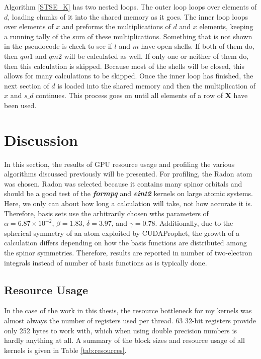 \documentclass[12pt]{report}
\newcommand{\kernel}[1]{\textit{\textbf{#1}}}
\begin{document}
Algorithm \ref{STSE_K} has two nested loops. The outer loop loops over elements of $d$, loading chunks of it into the shared memory as it goes. The inner loop loops over elements of $x$ and preforms the multiplications of $d$ and $x$ elements, keeping a running tally of the sum of these multiplications. Something that is not shown in the pseudocode is check to see if $l$ and $m$ have open shells. If both of them do, then $qm1$ and $qm2$ will be calculated as well. If only one or neither of them do, then this calculation is skipped. Because most of the shells will be closed, this allows for many calculations to be skipped. Once the inner loop has finished, the next section of $d$ is loaded into the shared memory and then the multiplication of $x$ and $s\_d$ continues. This process goes on until all elements of a row of \textbf{X} have been used.

\section{Discussion}
In this section, the results of GPU resource usage and profiling the various algorithms discussed previously will be presented. For profiling, the Radon atom was chosen. Radon was selected because it contains many spinor orbitals and should be a good test of the \kernel{formpq} and \kernel{eint2} kernels on large atomic systems. Here, we only can about how long a calculation will take, not how accurate it is. Therefore, basis sets use the arbitrarily chosen wtbs parameters of $\alpha = 6.87\times10^{-2}$, $\beta = 1.83$,  $\delta = 3.97$, and $\gamma = 0.78$. Additionally, due to the spherical symmetry of an atom exploited by CUDAProphet, the growth of a calculation differs depending on how the basis functions are distributed among the spinor symmetries. Therefore, results are reported in number of two-electron integrals instead of number of basis functions as is typically done.
\subsection{Resource Usage}
In the case of the work in this thesis, the resource bottleneck for my kernels was almost always the number of registers used per thread. 63 32-bit registers provide only 252 bytes to work with, which when using double precision numbers is hardly anything at all. A summary of the block sizes and resource usage of all kernels is given in Table \ref{tab:resources}.
\end{document}

